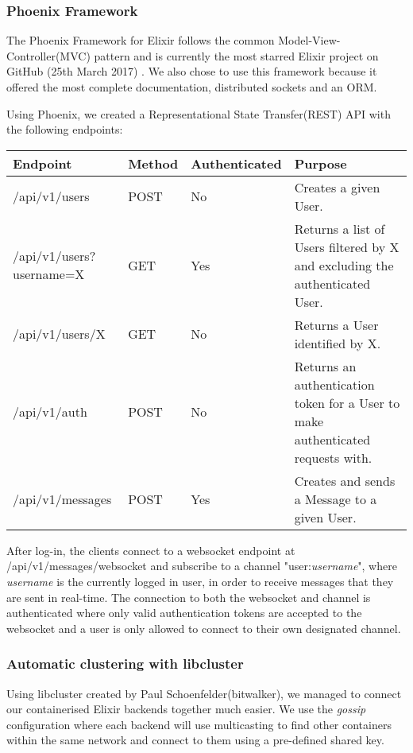 \documentclass[11pt,a4paper]{report}
\begin{document}
\subsubsection{Phoenix Framework}

The Phoenix Framework for Elixir follows the common Model-View-Controller(MVC) pattern and is currently the most starred Elixir project on GitHub (25th March 2017) \cite{website:github_elixir_trending}. We also chose to use this framework because it offered the most complete documentation, distributed sockets and an ORM.

Using Phoenix, we created a Representational State Transfer(REST) API with the following endpoints:

\begin{center}
\begin{tabular}{| l | l | l | p{4cm} |}
  \hline
  Endpoint & Method & Authenticated & Purpose \\
  \hline
  /api/v1/users & POST & No & Creates a given User. \\
  \hline
  /api/v1/users?username=X & GET & Yes & Returns a list of Users filtered by X and excluding the authenticated User. \\
  \hline
  /api/v1/users/X & GET & No & Returns a User identified by X. \\
  \hline
  /api/v1/auth & POST & No & Returns an authentication token for a User to make authenticated requests with. \\
  \hline
  /api/v1/messages & POST & Yes & Creates and sends a Message to a given User. \\
  \hline
\end{tabular}
\end{center}

After log-in, the clients connect to a websocket endpoint at /api/v1/messages/websocket and subscribe to a channel "user:\emph{username}", where \emph{username} is the currently logged in user, in order to receive messages that they are sent in real-time. The connection to both the websocket and channel is authenticated where only valid authentication tokens are accepted to the websocket and a user is only allowed to connect to their own designated channel.

\subsubsection{Automatic clustering with libcluster}

Using libcluster created by Paul Schoenfelder(bitwalker), we managed to connect our containerised Elixir backends together much easier. We use the \textit{gossip} configuration where each backend will use multicasting to find other containers within the same network and connect to them using a pre-defined shared key.
\end{document}
